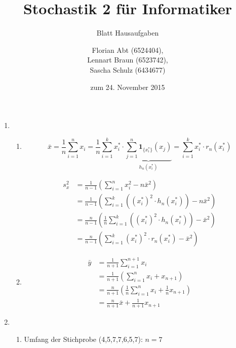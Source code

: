 \documentclass[a4paper]{scrartcl}
\title{Stochastik 2 für Informatiker}
\subtitle{Blatt {\blattnr} Hausaufgaben}
\author{
    Florian Abt (6524404), \\
    Lennart Braun (6523742), \\
    Sascha Schulz (6434677)
}
\date{zum 24. November 2015}
\def \blattnr {6}
\begin{document}
\maketitle

\begin{enumerate}[label=\bfseries \blattnr.\arabic*]

\item
\begin{enumerate}
 \item 
 
 \begin{equation*}
      \bar{x} 
      = \frac1n \sum_{i=1}^n x_i 
      = \frac1n \sum_{i=1}^k x_i^* \cdot \underbrace{\sum_{j=1}^n \mathbf{1}_{\{x_i^*\}}(x_j)}_{h_n(x_i^*)}
      = \sum_{i=1}^k x_i^* \cdot r_n(x_i^*)
 \end{equation*}
 
 \begin{equation*}
  \begin{split}
     s_x^2 
     &= \frac1{n-1} \left( \sum_{i=1}^n x_i^2 - n\bar{x}^2 \right) \\
     &= \frac1{n-1} \left( \sum_{i=1}^k \left( (x_i^*)^2 \cdot h_n(x_i^*) \right) - n\bar{x}^2  \right) \\
     &= \frac{n}{n-1} \left(\frac1n \sum_{i=1}^k \left( (x_i^*)^2 \cdot h_n(x_i^*) \right) - \bar{x}^2  \right) \\
     &= \frac{n}{n-1} \left( \sum_{i=1}^k (x_i^*)^2 \cdot r_n(x_i^*) - \bar{x}^2  \right) 
     \end{split}
 \end{equation*}
 
 \item 
 \begin{equation*}
  \begin{split}
      \bar{y} 
      &= \frac1{n+1} \sum_{i=1}^{n+1} x_i  \\
      &= \frac1{n+1} \left( \sum_{i=1}^{n} x_i + x_{n+1} \right) \\
      &= \frac{n}{n+1} \left( \frac1n \sum_{i=1}^{n} x_i + \frac1n x_{n+1} \right) \\
      &= \frac{n}{n+1} \bar{x} + \frac1{n+1} x_{n+1}
  \end{split}
 \end{equation*}
 
\end{enumerate}

\item

\begin{enumerate}
 \item
    Umfang der Stichprobe (4,5,7,7,6,5,7): $n=7$


\end{enumerate}
\end{enumerate}
\end{document}
